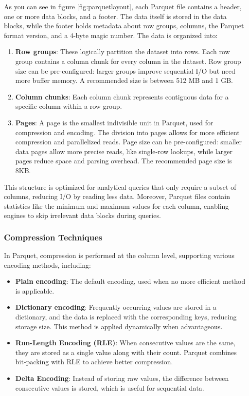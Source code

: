 As you can see in figure \ref{fig:parquetlayout}, each Parquet file contains a header, one or more data blocks, and a footer. The data itself is stored in the data blocks, while the footer holds metadata about row groups, columns, the Parquet format version, and a 4-byte magic number. The data is organized into:
\begin{enumerate}
    \item \textbf{Row groups}: These logically partition the dataset into rows. Each row group contains a column chunk for every column in the dataset. Row group size can be pre-configured: larger groups improve sequential I/O but need more buffer memory. A recommended size is between 512 MB and 1 GB.
    \item \textbf{Column chunks}: Each column chunk represents contiguous data for a specific column within a row group.
    \item \textbf{Pages}: A page is the smallest indivisible unit in Parquet, used for compression and encoding. The division into pages allows for more efficient compression and parallelized reads. Page size can be pre-configured:
    smaller data pages allow more precise reads, like single-row lookups, while larger pages reduce space and parsing overhead. The recommended page size is 8KB.
\end{enumerate}

This structure is optimized for analytical queries that only require a subset of columns, reducing I/O by reading less data. Moreover, Parquet files contain statistics like the minimum and maximum values for each column, enabling engines to skip irrelevant data blocks during queries.

\subsubsection{Compression Techniques}

In Parquet, compression is performed at the column level, supporting various encoding methods, including:
\begin{itemize}
    \item \textbf{Plain encoding}: The default encoding, used when no more efficient method is applicable.
    \item \textbf{Dictionary encoding}: Frequently occurring values are stored in a dictionary, and the data is replaced with the corresponding keys, reducing storage size. This method is applied dynamically when advantageous.
    \item \textbf{Run-Length Encoding (RLE)}: When consecutive values are the same, they are stored as a single value along with their count. Parquet combines bit-packing with RLE to achieve better compression.
    \item \textbf{Delta Encoding}: Instead of storing raw values, the difference between consecutive values is stored, which is useful for sequential data.
\end{itemize}

